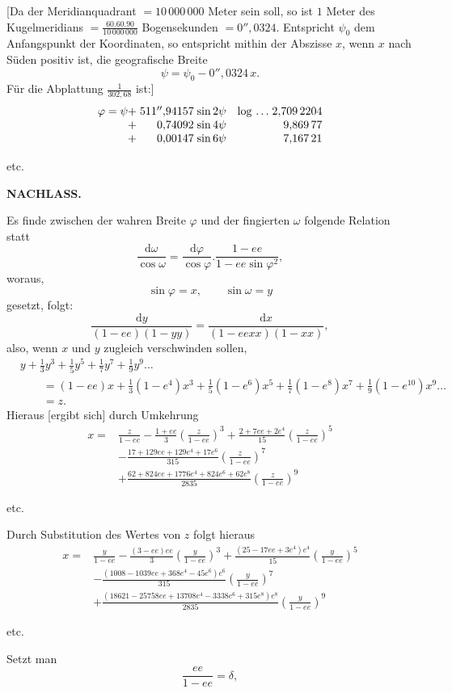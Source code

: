 [Da der Meridianquadrant \(=10\,000\,000\) Meter sein soll, so ist \(1\) Meter des Kugelmeridians \(=\frac{60.60.90}{10\,000\,000}\) Bogensekunden \(=0''{,}0324\). Entspricht \(\psi_0\) dem Anfangspunkt der Koordinaten, so entspricht mithin der Abszisse \(x\), wenn \(x\) nach Süden positiv ist, die geografische Breite
\[\psi=\psi_0-0''{,}0324\,x.\]
Für die Abplattung \(\frac1{302{,}68}\) ist:]
\[
\begin{array}{@{}r@{\;}r@{\;}l@{\quad}l@{\;}r@{}}
\varphi=\psi+&511''{,}94157&\sin2\psi&\log\,.\,.\,.&2{,}709\,2204\\
+&0{,}74092&\sin4\psi&&9{,}869\,77\\
+&0{,}00147&\sin6\psi&&7{,}167\,21
\end{array}
\]
{\centering etc.\par}

\par\clearpage
{}\hfill{\small\textbf{NACHLASS.}}\hfill\null\par\medskip
{\centering [23.]\par}
Es finde zwischen der wahren Breite \(\varphi\) und der fingierten \(\omega\) folgende Relation statt
\[
\frac{\mathrm d\omega}{\cos\omega}=\frac{\mathrm d\varphi}{\cos\varphi}.\frac{1-ee}{1-ee\sin\varphi^2},
\]
\noindent woraus,
\[\sin\varphi=x,\qquad\sin\omega=y\]
\noindent gesetzt, folgt:
\[
\frac{\mathrm dy}{(1-ee)(1-yy)}=\frac{\mathrm dx}{(1-eexx)(1-xx)},
\]
\noindent also, wenn \(x\) und \(y\) zugleich verschwinden sollen,
\[
\begin{aligned}
&y+\tfrac13y^3+\tfrac15y^5+\tfrac17y^7+\tfrac19y^9\ldots\\
&\qquad=(1-ee)x+\tfrac13(1-e^4)x^3+\tfrac15(1-e^6)x^5+\tfrac17(1-e^8)x^7+\tfrac19(1-e^{10})x^9\ldots\\
&\qquad=z.
\end{aligned}
\]
Hieraus [ergibt sich] durch Umkehrung
\[
\begin{aligned}
x={}&\frac{z}{1-ee}-\frac{1+ee}{3}\left(\frac{z}{1-ee}\right)^3+\frac{2+7ee+2e^4}{15}\left(\frac{z}{1-ee}\right)^5\\
&-\frac{17+129ee+129e^4+17e^6}{315}\left(\frac{z}{1-ee}\right)^7\\
&+\frac{62+824ee+1776e^4+824e^6+62e^8}{2835}\left(\frac{z}{1-ee}\right)^9
\end{aligned}
\]
{\centering etc.\par}
Durch Substitution des Wertes von \(z\) folgt hieraus
\[
\begin{aligned}
x={}&\frac{y}{1-ee}-\frac{(3-ee)ee}{3}\left(\frac{y}{1-ee}\right)^3+\frac{(25-17ee+3e^4)e^4}{15}\left(\frac{y}{1-ee}\right)^5\\
&-\frac{(1008-1039ee+368e^4-45e^6)e^6}{315}\left(\frac{y}{1-ee}\right)^7\\
&+\frac{(18621-25758ee+13708e^4-3338e^6+315e^8)e^8}{2835}\left(\frac{y}{1-ee}\right)^9
\end{aligned}
\]
{\centering etc.\par}
Setzt man
\[\frac{ee}{1-ee}=\delta,\]

